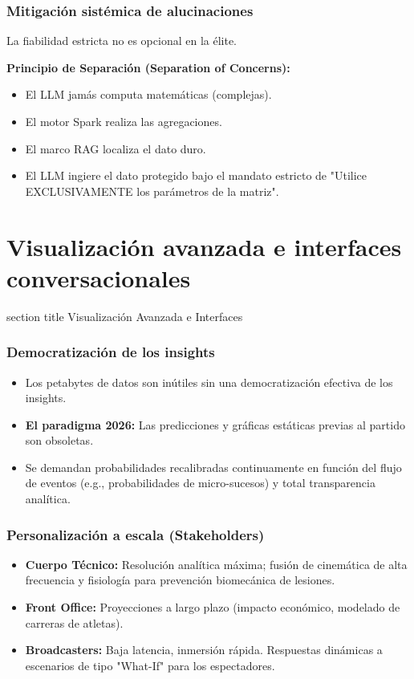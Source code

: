 \documentclass[aspectratio=169]{beamer}
\newcommand{\sectionpagetitle}[1]{
\begin{frame}
	\vspace{1cm}
	\begin{beamercolorbox}[sep=8pt,center,wd=\textwidth]{section title}
		\usebeamerfont{section title}#1\par
	\end{beamercolorbox}
\end{frame}
}
\begin{document}
\begin{frame}\frametitle{Mitigación sistémica de alucinaciones}
La fiabilidad estricta no es opcional en la élite.

\vspace{0.3em}
\textbf{Principio de Separación (Separation of Concerns):}
\begin{itemize}
    \item El LLM jamás computa matemáticas (complejas).
    \item El motor Spark realiza las agregaciones.
    \item El marco RAG localiza el dato duro.
    \item El LLM ingiere el dato protegido bajo el mandato estricto de "Utilice EXCLUSIVAMENTE los parámetros de la matriz".
\end{itemize}
\end{frame}

\section{Visualización avanzada e interfaces conversacionales}
\sectionpagetitle{Visualización Avanzada e Interfaces}

\begin{frame}\frametitle{Democratización de los insights}
\begin{itemize}
    \item Los petabytes de datos son inútiles sin una democratización efectiva de los insights.
    \item \textbf{El paradigma 2026:} Las predicciones y gráficas estáticas previas al partido son obsoletas.
    \item Se demandan probabilidades recalibradas continuamente en función del flujo de eventos (e.g., probabilidades de micro-sucesos) y total transparencia analítica.
\end{itemize}
\end{frame}

\begin{frame}\frametitle{Personalización a escala (Stakeholders)}
\begin{itemize}
    \item \textbf{Cuerpo Técnico:} Resolución analítica máxima; fusión de cinemática de alta frecuencia y fisiología para prevención biomecánica de lesiones.
    \item \textbf{Front Office:} Proyecciones a largo plazo (impacto económico, modelado de carreras de atletas).
    \item \textbf{Broadcasters:} Baja latencia, inmersión rápida. Respuestas dinámicas a escenarios de tipo "What-If" para los espectadores.
\end{itemize}
\end{frame}
\end{document}
